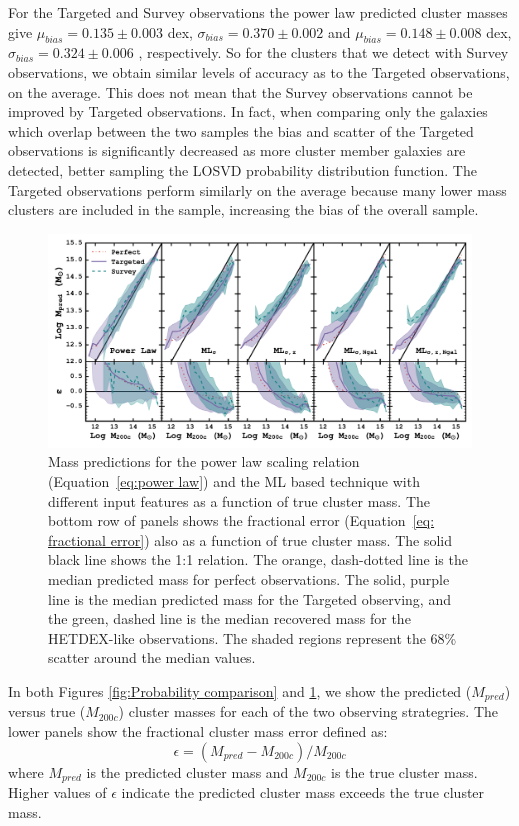 \documentclass[fleqn,usenatbib]{mnras}
\begin{document}
For the Targeted and Survey observations the power law predicted cluster masses give $\mu_{bias} =0.135\pm{0.003}$ dex, $\sigma_{bias} = 0.370\pm{0.002}$ and $\mu_{bias} =0.148\pm{0.008}$ dex, $\sigma_{bias} = 0.324\pm{0.006}$ , respectively. So for the clusters that we detect with Survey observations, we obtain similar levels of accuracy as to the Targeted observations, on the average. This does not mean that the Survey observations cannot be improved by Targeted observations. In fact, when comparing only the galaxies which overlap between the two samples the bias and scatter of the Targeted observations is significantly decreased as more cluster member galaxies are detected, better sampling the LOSVD probability distribution function. The Targeted observations perform similarly on the average because many lower mass clusters are included in the sample, increasing the bias of the overall sample.

\begin{figure} 
	\includegraphics[width=\textwidth]{figures/MLcomparison.pdf} 
	\caption[ML based cluster mass predictions]{Mass predictions for the power law scaling relation (Equation~\ref{eq:power law}) and the ML based technique with different input features as a function of true cluster mass. The bottom row of panels shows the fractional error (Equation~\ref{eq: fractional error}) also as a function of true cluster mass. The solid black line shows the 1:1 relation. The orange, dash-dotted line is the median predicted mass for perfect observations. The solid, purple line is the median predicted mass for the Targeted observing, and the green, dashed line is the median recovered mass for the HETDEX-like observations. The shaded regions represent the 68\% scatter around the median values.}
	\label{fig: ML comparison} 
\end{figure}

In both Figures \ref{fig:Probability comparison} and \ref{fig: ML comparison}, we show the predicted ($M_{pred}$) versus true ($M_{200c}$) cluster masses for each of the two observing strategries. The lower panels show the fractional cluster mass error defined as: 
\begin{equation}\label{eq: fractional error}
	\epsilon = (M_{pred} - M_{200c})/M_{200c}
\end{equation}
where $M_{pred}$ is the predicted cluster mass and $M_{200c}$ is the true cluster mass. Higher values of $\epsilon$ indicate the predicted cluster mass exceeds the true cluster mass.
\end{document}
